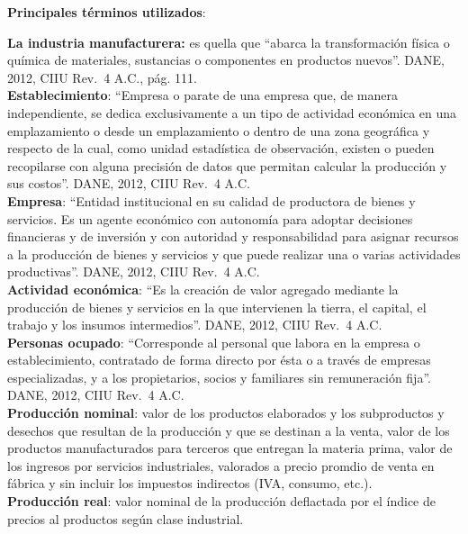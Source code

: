 \documentclass[
]{article}
\begin{document}
\textbf{Principales términos utilizados}:

\textbf{La industria manufacturera:} es quella que ``abarca la
transformación física o química de materiales, sustancias o componentes
en productos nuevos''. DANE, 2012, CIIU Rev.~4 A.C., pág. 111.\\

\textbf{Establecimiento}: ``Empresa o parate de una empresa que, de
manera independiente, se dedica exclusivamente a un tipo de actividad
económica en una emplazamiento o desde un emplazamiento o dentro de una
zona geográfica y respecto de la cual, como unidad estadística de
observación, existen o pueden recopilarse con alguna precisión de datos
que permitan calcular la producción y sus costos''. DANE, 2012, CIIU
Rev.~4 A.C.\\

\textbf{Empresa}: ``Entidad institucional en su calidad de productora de
bienes y servicios. Es un agente económico con autonomía para adoptar
decisiones financieras y de inversión y con autoridad y responsabilidad
para asignar recursos a la producción de bienes y servicios y que puede
realizar una o varias actividades productivas''. DANE, 2012, CIIU Rev.~4
A.C.\\

\textbf{Actividad económica}: ``Es la creación de valor agregado
mediante la producción de bienes y servicios en la que intervienen la
tierra, el capital, el trabajo y los insumos intermedios''. DANE, 2012,
CIIU Rev.~4 A.C.\\

\textbf{Personas ocupado}: ``Corresponde al personal que labora en la
empresa o establecimiento, contratado de forma directo por ésta o a
través de empresas especializadas, y a los propietarios, socios y
familiares sin remuneración fija''. DANE, 2012, CIIU Rev.~4 A.C.\\

\textbf{Producción nominal}: valor de los productos elaborados y los
subproductos y desechos que resultan de la producción y que se destinan
a la venta, valor de los productos manufacturados para terceros que
entregan la materia prima, valor de los ingresos por servicios
industriales, valorados a precio promdio de venta en fábrica y sin
incluir los impuestos indirectos (IVA, consumo, etc.).\\

\textbf{Producción real}: valor nominal de la producción deflactada por
el índice de precios al productos según clase industrial.\\
\end{document}
